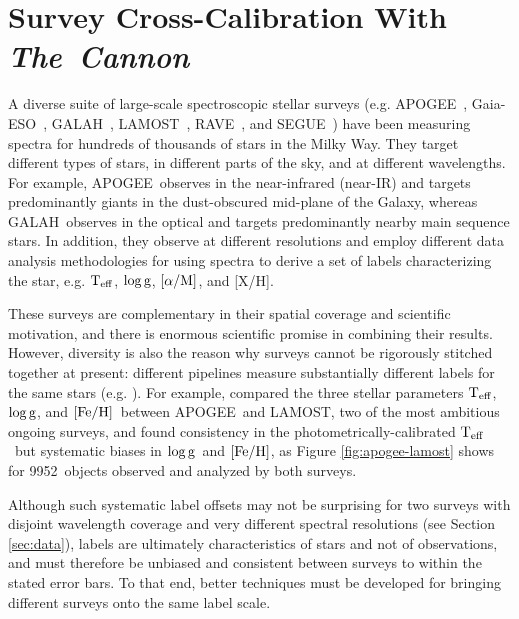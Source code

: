 \documentclass[12pt, letterpaper, preprint]{aastex}
\newcommand{\tc}{\textsl{The~Cannon}}
\newcommand{\apogee}{APOGEE}
\newcommand{\lamost}{LAMOST}
\newcommand{\segue}{SEGUE}
\newcommand{\rave}{RAVE}
\newcommand{\galah}{GALAH}
\newcommand{\gaiaeso}{Gaia-ESO}
\newcommand{\teff}{\mbox{$\rm T_{eff}$}}
\newcommand{\feh}{\mbox{$\rm [Fe/H]$}}
\newcommand{\alpham}{\mbox{$\rm [\alpha/M]$}}
\newcommand{\logg}{\mbox{$\rm \log g$}}
\newcommand{\ntrobj}{9952}
\begin{document}

\section{Survey Cross-Calibration With \tc }

A diverse suite of large-scale spectroscopic stellar surveys
(e.g. 
\apogee\ \citep{Majewski2015},
\gaiaeso\ \citep{Gilmore2012},
\galah\ \citep{DeSilva2015},
\lamost\ \citep{Zhao2012},
\rave\ \citep{Kordopatis2013}, and
\segue\ \citep{Yanny2009})
have been measuring spectra for hundreds of thousands of stars in the Milky Way.
They target different types of stars, in different parts of the sky, and at different wavelengths.
For example, \apogee\ observes in the near-infrared (near-IR)
and targets predominantly giants in the dust-obscured mid-plane of the Galaxy,
whereas \galah\ observes in the optical and targets
predominantly nearby main sequence stars. 
In addition, they observe at different resolutions and
employ different data analysis methodologies for using
spectra to derive a set of labels characterizing the star,
e.g. \teff , \logg , \alpham, and [X/H].

These surveys are complementary in their spatial coverage and scientific motivation,
and there is enormous scientific promise in combining their results.
However, diversity is also the reason why surveys cannot be rigorously stitched together at present:
different pipelines measure substantially different labels for the same stars (e.g. \citet{Smiljanic2014}). 
For example, \citet{Chen2015} compared the three stellar parameters \teff, \logg, and \feh\ between \apogee\ and \lamost, two of the most ambitious ongoing surveys, and found consistency in the photometrically-calibrated \teff\
but systematic biases in \logg\ and \feh, as 
Figure \ref{fig:apogee-lamost} shows for \ntrobj\ objects 
observed and analyzed by both surveys. 

Although such systematic label offsets may not be surprising for two surveys with disjoint wavelength coverage and very different spectral resolutions (see Section \ref{sec:data}), labels are ultimately characteristics of stars and not of observations, and must therefore be unbiased and consistent between surveys to within the stated error bars.
To that end, better techniques must be developed for bringing different surveys onto the same label scale. 
\end{document}
